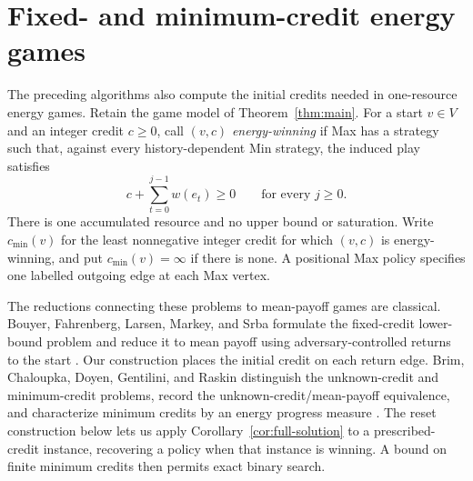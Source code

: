 \section{Fixed- and minimum-credit energy games}
\label{sec:energy-credits}

The preceding algorithms also compute the initial credits needed in
one-resource energy games. Retain the game model of
Theorem~\ref{thm:main}. For a start $v\in V$ and an integer credit
$c\ge0$, call
$(v,c)$ \emph{energy-winning} if Max has a strategy such that, against
every history-dependent Min strategy, the induced play satisfies
\begin{equation}
 c+\sum_{t=0}^{j-1}w(e_t)\ge0\qquad\text{for every }j\ge0.
 \label{eq:energy-objective}
\end{equation}
There is one accumulated resource and no upper bound or saturation.
Write $c_{\min}(v)$ for the least nonnegative integer credit for which
$(v,c)$ is energy-winning, and put $c_{\min}(v)=\infty$ if there is
none. A positional Max policy specifies one labelled outgoing edge at
each Max vertex.

The reductions connecting these problems to mean-payoff games are
classical. Bouyer, Fahrenberg, Larsen, Markey, and Srba formulate the
fixed-credit lower-bound problem and reduce it to mean payoff using
adversary-controlled returns to the start
\cite[Section~2.1 and Proposition~12]{BouyerEtAl2008}. Our construction
places the initial credit on each return edge. Brim, Chaloupka, Doyen,
Gentilini, and Raskin distinguish the unknown-credit and minimum-credit
problems, record the unknown-credit/mean-payoff equivalence, and
characterize minimum credits by an energy progress measure
\cite[Section~2 and Theorems~3 and~5]{BrimEtAl2011}. The reset construction
below lets us apply Corollary~\ref{cor:full-solution} to a prescribed-credit
instance, recovering a policy when that instance is winning. A bound on
finite minimum credits then permits exact binary search.

